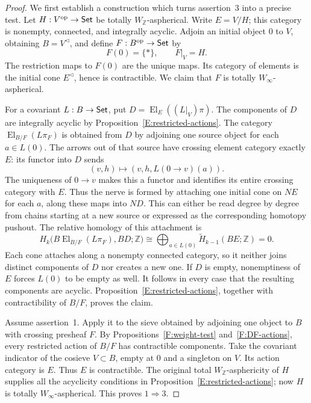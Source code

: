 \begin{proof}
We first establish a construction which turns assertion~3
into a precise test. Let $H:V^{\mathrm{op}}\to\mathsf{Set}$ be totally
$W_{\mathbb Z}$-aspherical. Write $E=V/H$; this category is
nonempty, connected, and integrally acyclic. Adjoin an initial
object $0$ to $V$, obtaining $B=V^{\triangleleft}$, and define
$F:B^{\mathrm{op}}\to\mathsf{Set}$ by
\[
 F(0)=\{*\},\qquad F|_V=H.
\]
The restriction maps to $F(0)$ are the unique maps. Its category
of elements is the initial cone $E^{\triangleleft}$, hence is
contractible. We claim that $F$ is totally
$W_\infty$-aspherical.

For a covariant $L:B\to\mathsf{Set}$, put
$D=\operatorname{El}_E((L|_V)\pi)$. The components of $D$ are
integrally acyclic by Proposition~\ref{E:restricted-actions}.
The category
$\operatorname{El}_{B/F}(L\pi_F)$ is obtained from $D$ by
adjoining one source object for each $a\in L(0)$. The arrows
out of that source have crossing element category exactly $E$:
its functor into $D$ sends
\[
 (v,h)\longmapsto (v,h,L(0\to v)(a)).
\]
The uniqueness of $0\to v$ makes this a functor and identifies
its entire crossing category with $E$. Thus the nerve is formed
by attaching one initial cone on $NE$ for each $a$, along these
maps into $ND$. This can either be read degree by degree from
chains starting at a new source or expressed as the corresponding
homotopy pushout. The relative homology of this attachment is
\[
 H_k\bigl(B\operatorname{El}_{B/F}(L\pi_F),BD;\mathbb Z\bigr)
   \cong
 \bigoplus_{a\in L(0)}\widetilde H_{k-1}(BE;\mathbb Z)=0.
\]
Each cone attaches along a nonempty connected category, so it
neither joins distinct components of $D$ nor creates a new one.
If $D$ is empty, nonemptiness of $E$ forces $L(0)$ to be empty
as well. It follows in every case that the resulting components
are acyclic. Proposition~\ref{E:restricted-actions}, together
with contractibility of $B/F$, proves the claim.

Assume assertion~1. Apply it to the sieve obtained by adjoining
one object to $B$ with crossing presheaf $F$. By
Propositions~\ref{F:weight-test} and~\ref{F:DF-actions}, every
restricted action of $B/F$ has contractible components. Take
the covariant indicator of the cosieve $V\subset B$, empty
at $0$ and a singleton on $V$. Its action category is $E$.
Thus $E$ is contractible. The original total
$W_{\mathbb Z}$-asphericity of $H$ supplies all the acyclicity
conditions in Proposition~\ref{E:restricted-actions}; now
$H$ is totally $W_\infty$-aspherical. This proves $1\Rightarrow3$.


\end{proof}
